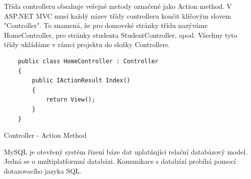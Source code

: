 \documentclass[a4paper, 12pt]{report}
\begin{document}
				Třída controlleru obsahuje veřejné metody označené jako Action method. V ASP.NET MVC musí každý název třídy controlleru končit klíčovým slovem "Controller". To znamená, že pro domovské stránky třídu nazýváme HomeController, pro stránky studenta StudentController, apod. Všechny tyto třídy ukládáme v rámci projektu do složky Controllers.
	\begin{listing}[H]
	\begin{verbatim}
	public class HomeController : Controller
	{
		public IActionResult Index()
		{
			return View();
		}
	}
	\end{verbatim}
	\caption{Controller - Action Method}
	\label{ActionMethod}
	\end{listing}
		MySQL je otevřený systém řízení báze dat uplatňující relační databázový model. Jedná se o multiplatformní databázi. Komunikace s databází probíhá pomocí dotazovacího jazyka SQL.\cite{MySQL_Wiki_CZ}

	\seznamTabulek
	
	\seznamObrazku

	\renewcommand\listoflistingscaption{Seznam zdrojových kódů}
	\listoflistings
	

	
	

\end{document}
